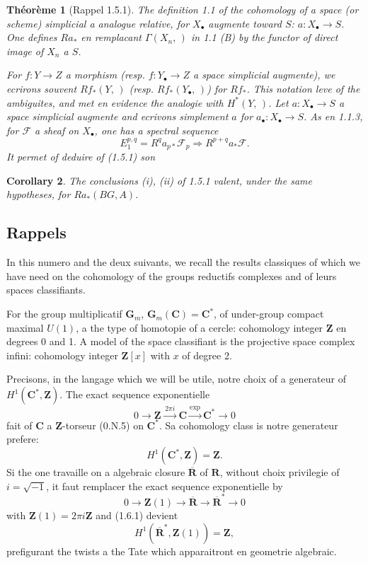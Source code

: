 \documentclass[11pt,a4paper]{article}
\theoremstyle{plain}
\newtheorem{theorem}{Th\'eor\`eme}[section]
\newtheorem{corollary}[theorem]{Corollary}
\theoremstyle{definition}
\begin{document}
\begin{theorem}[Rappel 1.5.1]
The definition 1.1 of the cohomology of a space (or scheme) simplicial a analogue relative, for $X_\bullet$ augmente toward $S$: $a : X_\bullet \to S$. One defines $R a_*$ en remplacant $\Gamma(X_n, \,)$ in 1.1 (B) by the functor of direct image of $X_n$ a $S$.

For $f : Y \to Z$ a morphism (resp. $f : Y_\bullet \to Z$ a space simplicial augmente), we ecrirons souvent $R f_*(Y, \,)$ (resp. $R f_*(Y_\bullet, \,)$) for $R f_*$. This notation leve of the ambiguites, and met en evidence the analogie with $H^*(Y, \,)$. Let $a : X_\bullet \to S$ a space simplicial augmente and ecrivons simplement $a$ for $a_\bullet : X_\bullet \to S$. As en 1.1.3, for $\mathscr{F}$ a sheaf on $X_\bullet$, one has a spectral sequence
\begin{equation}\label{1.5.3}
E_1^{p,q} = R^q a_{p*} \mathscr{F}_p \Rightarrow R^{p+q} a_* \mathscr{F}.
\end{equation}
It permet of deduire of (1.5.1) son
\end{theorem}

\begin{corollary}\label{1.5.4}
The conclusions (i), (ii) of 1.5.1 valent, under the same hypotheses, for $R a_*(BG, A)$.
\end{corollary}

\subsection{Rappels}\label{1.6}

In this numero and the deux suivants, we recall the results classiques of which we have need on the cohomology of the groups reductifs complexes and of leurs spaces classifiants.

For the group multiplicatif $\mathbf{G}_m$, $\mathbf{G}_m(\mathbf{C}) = \mathbf{C}^*$, of under-group compact maximal $U(1)$, a the type of homotopie of a cercle: cohomology integer $\mathbf{Z}$ en degrees 0 and 1. A model of the space classifiant is the projective space complex infini: cohomology integer $\mathbf{Z}[x]$ with $x$ of degree 2.

Precisons, in the langage which we will be utile, notre choix of a generateur of $H^1(\mathbf{C}^*, \mathbf{Z})$. The exact sequence exponentielle
\[
0 \to \mathbf{Z} \xrightarrow{\,2\pi i\,} \mathbf{C} \xrightarrow{\exp} \mathbf{C}^* \to 0
\]
fait of $\mathbf{C}$ a $\mathbf{Z}$-torseur (0.N.5) on $\mathbf{C}^*$. Sa cohomology class is notre generateur prefere:
\begin{equation}\label{1.6.1}
H^1(\mathbf{C}^*, \mathbf{Z}) = \mathbf{Z}.
\end{equation}
Si the one travaille on a algebraic closure $\overline{\mathbf{R}}$ of $\mathbf{R}$, without choix privilegie of $i = \sqrt{-1}$, it faut remplacer the exact sequence exponentielle by
\[
0 \to \mathbf{Z}(1) \to \overline{\mathbf{R}} \to \overline{\mathbf{R}}^* \to 0
\]
with $\mathbf{Z}(1) = 2\pi i \mathbf{Z}$ and (1.6.1) devient
\begin{equation}\label{1.6.2}
H^1(\overline{\mathbf{R}}^*, \mathbf{Z}(1)) = \mathbf{Z},
\end{equation}
prefigurant the twists a the Tate which apparaitront en geometrie algebraic.
\end{document}

